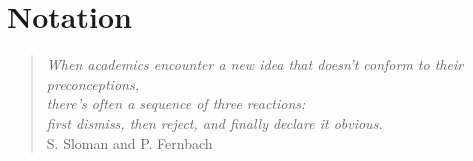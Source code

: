 %
%


\chapter{Notation}

\begin{quote}
\begin{flushright}
\emph{When academics encounter a new idea that doesn’t conform to their preconceptions,\\
there’s often a sequence of three reactions:\\
first dismiss, then reject, and finally declare it obvious.}\\
S. Sloman and P. Fernbach
\end{flushright}
\end{quote}
\bigskip

